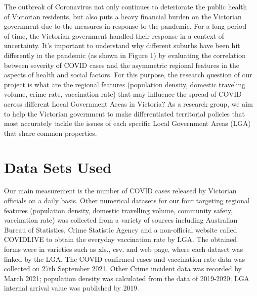 \documentclass[a4, 11pt]{article}
\begin{document}
The outbreak of Coronavirus not only continues to deteriorate the public health of Victorian residents, but also puts a heavy financial burden on the Victorian government due to the measures in response to the pandemic. For a long period of time, the Victorian government handled their response in a context of uncertainty. It’s important to understand why different suburbs have been hit differently in the pandemic (as shown in Figure 1) by evaluating the correlation between severity of COVID cases and the asymmetric regional features in the aspects of health and social factors. For this purpose, the research question of our project is what are the regional features (population density, domestic traveling volume, crime rate, vaccination rate) that may influence the spread of COVID across different Local Government Areas in Victoria? As a research group, we aim to help the Victorian government to make differentiated territorial policies that most accurately tackle the issues of each specific Local Government Areas (LGA) that share common properties.

\section{Data Sets Used}
Our main measurement is the number of COVID cases released by Victorian officials on a daily basis. Other numerical datasets for our four targeting regional features (population density, domestic travelling volume, community safety, vaccination rate) was collected from a variety of sources including Australian Bureau of Statistics, Crime Statistic Agency and a non-official website called COVIDLIVE to obtain the everyday vaccination rate by LGA. The obtained forms were in varieties such as xls., csv. and web page, where each dataset was linked by the LGA. The COVID confirmed cases and vaccination rate data was collected on 27th September 2021. Other Crime incident data was recorded by March 2021; population density was calculated from the data of 2019-2020; LGA internal arrival value was published by 2019.
\end{document}
